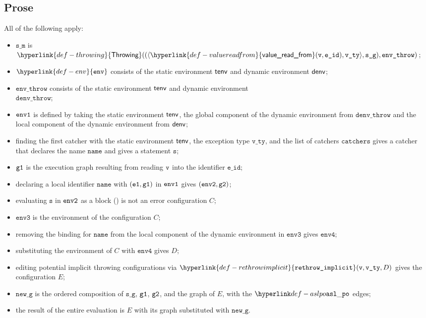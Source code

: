 \documentclass{book}
\newcommand\ErrorConfig[0]{\hyperlink{def-errorconfig}{\texttt{\#DE}}}
\newcommand\ProseOrError[0]{\ProseTerminateAs{\ErrorConfig}}
\newcommand\rethrowimplicit[0]{\hyperlink{def-rethrowimplicit}{\texttt{rethrow\_implicit}}}
\newcommand\valuereadfrom[0]{\hyperlink{def-valuereadfrom}{\textsf{value\_read\_from}}}
\newcommand\Throwing[0]{\hyperlink{def-throwing}{\textsf{Throwing}}}
\newcommand\env[0]{\hyperlink{def-env}{\texttt{env}}}
\newcommand\envthree[0]{\texttt{env3}}
\newcommand\envfour[0]{\texttt{env4}}
\newcommand\newg[0]{\texttt{new\_g}}
\newcommand\vs[0]{\texttt{s}}
\newcommand\veone[0]{\texttt{e1}}
\newcommand\name[0]{\texttt{name}}
\newcommand\catchers[0]{\texttt{catchers}}
\newcommand\envthrow[0]{\texttt{env\_throw}}
\newcommand\denvthrow[0]{\texttt{denv\_throw}}
\newcommand\sm[0]{\texttt{s\_m}}
\newcommand\sg[0]{\texttt{s\_g}}
\newcommand\vvty[0]{\texttt{v\_ty}}
\newcommand\eid[0]{\texttt{e\_id}}
\begin{document}
  \subsection{Prose}
  All of the following apply:
  \begin{itemize}
    \item $\sm$ is $\Throwing((\langle \valuereadfrom(\vv, \eid), \vvty \rangle, \sg), \envthrow)$;
    \item $\env$ consists of the static environment $\textsf{tenv}$ and dynamic environment $\textsf{denv}$;
    \item $\envthrow$ consists of the static environment $\textsf{tenv}$ and dynamic environment \\ $\denvthrow$;
    \item $\texttt{env1}$ is defined by taking the static environment $\textsf{tenv}$, the global component of the dynamic
    environment from $\denvthrow$ and the local component of the dynamic environment from $\textsf{denv}$;
    \item finding the first catcher with the static environment $\textsf{tenv}$, the exception type $\vvty$,
    and the list of catchers $\catchers$ gives a catcher that declares the name $\name$ and gives a statement $\vs$;
    \item $\texttt{g1}$ is the execution graph resulting from reading $\texttt{v}$ into the identifier $\eid$;
    \item declaring a local identifier $\name$ with $(\veone, \vgone)$ in $\texttt{env1}$ gives $(\texttt{env2}, \texttt{g2})$;
    \item evaluating $\vs$ in $\texttt{env2}$ as a block () is not an error
    configuration $C$\ProseOrError;
    \item $\envthree$ is the environment of the configuration $C$;
    \item removing the binding for $\name$ from the local component of the dynamic environment in $\envthree$
    gives $\envfour$;
    \item substituting the environment of $C$ with $\envfour$ gives $D$;
    \item editing potential implicit throwing configurations via $\rethrowimplicit(\vv, \vvty, D)$
    gives the configuration $E$;
    \item $\newg$ is the ordered composition of $\sg$, $\texttt{g1}$, $\texttt{g2}$, and the graph of $E$,
    with the $\aslpo$ edges;
    \item the result of the entire evaluation is $E$ with its graph substituted with $\newg$.
  \end{itemize}
\end{document}
